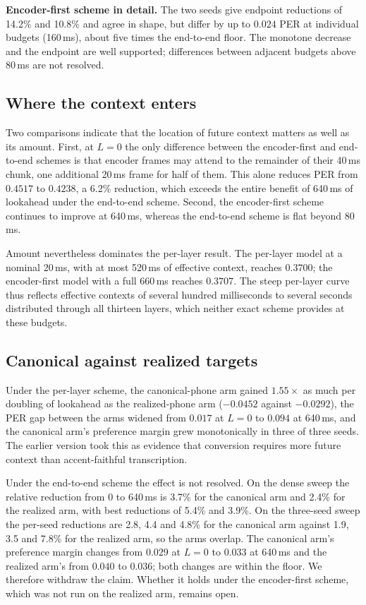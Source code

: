 \documentclass[preprint,12pt,authoryear]{elsarticle}
\begin{document}
\textbf{Encoder-first scheme in detail.} The two seeds give endpoint
reductions of 14.2\% and 10.8\% and agree in shape, but differ by up to
$0.024$ PER at individual budgets (160\,ms), about five times the end-to-end
floor. The monotone decrease and the endpoint are well supported;
differences between adjacent budgets above 80\,ms are not resolved.

\subsection{Where the context enters}
\label{sec:where}

Two comparisons indicate that the location of future context matters as well
as its amount. First, at $L=0$ the only difference between the encoder-first
and end-to-end schemes is that encoder frames may attend to the remainder of
their 40\,ms chunk, one additional 20\,ms frame for half of them. This alone
reduces PER from $0.4517$ to $0.4238$, a 6.2\% reduction, which exceeds the
entire benefit of 640\,ms of lookahead under the end-to-end scheme. Second,
the encoder-first scheme continues to improve at 640\,ms, whereas the
end-to-end scheme is flat beyond 80\,ms.

Amount nevertheless dominates the per-layer result. The per-layer model at a
nominal 20\,ms, with at most 520\,ms of effective context, reaches $0.3700$;
the encoder-first model with a full 660\,ms reaches $0.3707$. The steep
per-layer curve thus reflects effective contexts of several hundred
milliseconds to several seconds distributed through all thirteen layers,
which neither exact scheme provides at these budgets.

\subsection{Canonical against realized targets}
\label{sec:rq3}

Under the per-layer scheme, the canonical-phone arm gained $1.55\times$ as much
per doubling of lookahead as the realized-phone arm ($-0.0452$ against
$-0.0292$), the PER gap between the arms widened from $0.017$ at $L=0$ to
$0.094$ at 640\,ms, and the canonical arm's preference margin grew
monotonically in three of three seeds. The earlier version took this as
evidence that conversion requires more future context than accent-faithful
transcription.

Under the end-to-end scheme the effect is not resolved. On the dense sweep the
relative reduction from 0 to 640\,ms is 3.7\% for the canonical arm and 2.4\%
for the realized arm, with best reductions of 5.4\% and 3.9\%. On the
three-seed sweep the per-seed reductions are 2.8, 4.4 and 4.8\% for the
canonical arm against 1.9, 3.5 and 7.8\% for the realized arm, so the arms
overlap. The canonical arm's preference margin changes from $0.029$ at
$L=0$ to $0.033$ at 640\,ms and the realized arm's from $0.040$ to $0.036$;
both changes are within the floor. We therefore withdraw the claim. Whether
it holds under the encoder-first scheme, which was not run on the realized
arm, remains open.
\end{document}
